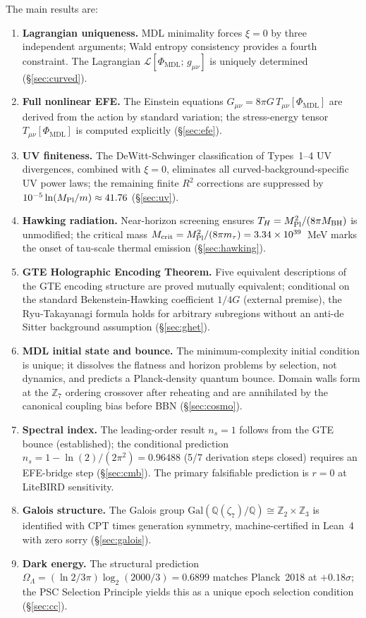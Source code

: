 \documentclass[11pt]{article}
\theoremstyle{remark}
\newcommand{\PHIMDL}{\Phi_{\mathrm{MDL}}}
\newcommand{\ZS}{\mathbb{Z}_7}
\newcommand{\MPl}{M_{\rm Pl}}
\newcommand{\Gmunu}{G_{\mu\nu}}
\newcommand{\Tmunu}{T_{\mu\nu}}
\newcommand{\LL}{\mathcal{L}}
\newcommand{\Omegalam}{\Omega_\Lambda}
\begin{document}
The main results are:
\begin{enumerate}
\item[(i)] \textbf{Lagrangian uniqueness.}  MDL minimality forces $\xi=0$ by three
  independent arguments; Wald entropy consistency provides a fourth constraint.  The
  Lagrangian $\LL[\PHIMDL;\,g_{\mu\nu}]$ is uniquely determined (\S\ref{sec:curved}).
\item[(ii)] \textbf{Full nonlinear EFE.}  The Einstein equations $\Gmunu = 8\pi G\,
  \Tmunu[\PHIMDL]$ are derived from the action by standard variation; the
  stress-energy tensor $\Tmunu[\PHIMDL]$ is computed explicitly (\S\ref{sec:efe}).
\item[(iii)] \textbf{UV finiteness.}  The DeWitt-Schwinger classification of Types~1--4
  UV divergences, combined with $\xi=0$, eliminates all curved-background-specific UV
  power laws; the remaining finite $R^2$ corrections are suppressed by $10^{-5}\ln
  (\MPl/m)\approx 41.76$ (\S\ref{sec:uv}).
\item[(iv)] \textbf{Hawking radiation.}  Near-horizon screening ensures $T_H =
  \MPl^2/(8\pi M_{\rm BH})$ is unmodified; the critical mass $M_{\rm crit} =
  \MPl^2/(8\pi m_\tau) = 3.34\times10^{39}$~MeV marks the onset of tau-scale thermal
  emission (\S\ref{sec:hawking}).
\item[(v)] \textbf{GTE Holographic Encoding Theorem.}  Five equivalent descriptions of
  the GTE encoding structure are proved mutually equivalent; conditional on the standard
  Bekenstein-Hawking coefficient $1/4G$ (external premise), the Ryu-Takayanagi formula
  holds for arbitrary subregions without an anti-de Sitter background assumption
  (\S\ref{sec:ghet}).
\item[(vi)] \textbf{MDL initial state and bounce.}  The minimum-complexity initial
  condition is unique; it dissolves the flatness and horizon problems by selection,
  not dynamics, and predicts a Planck-density quantum bounce.  Domain walls form at
  the $\ZS$ ordering crossover after reheating and are annihilated by the canonical
  coupling bias before BBN (\S\ref{sec:cosmo}).
\item[(vii)] \textbf{Spectral index.}  The leading-order result $n_s=1$ follows from the
  GTE bounce (established); the conditional prediction $n_s = 1 - \ln(2)/(2\pi^2) =
  0.96488$ (5/7 derivation steps closed) requires an EFE-bridge step (\S\ref{sec:cmb}).
  The primary falsifiable prediction is $r=0$ at LiteBIRD sensitivity.
\item[(viii)] \textbf{Galois structure.}  The Galois group
  $\mathrm{Gal}(\mathbb{Q}(\zeta_7)/\mathbb{Q})\cong\mathbb{Z}_2\times\mathbb{Z}_3$
  is identified with CPT times generation symmetry, machine-certified in Lean~4 with
  zero sorry (\S\ref{sec:galois}).
\item[(ix)] \textbf{Dark energy.}  The structural prediction $\Omegalam =
  (\ln 2/3\pi)\log_2(2000/3) = 0.6899$ matches Planck~2018 at $+0.18\sigma$;
  the PSC Selection Principle yields this as a unique epoch selection condition
  (\S\ref{sec:cc}).
\end{enumerate}
\end{document}
